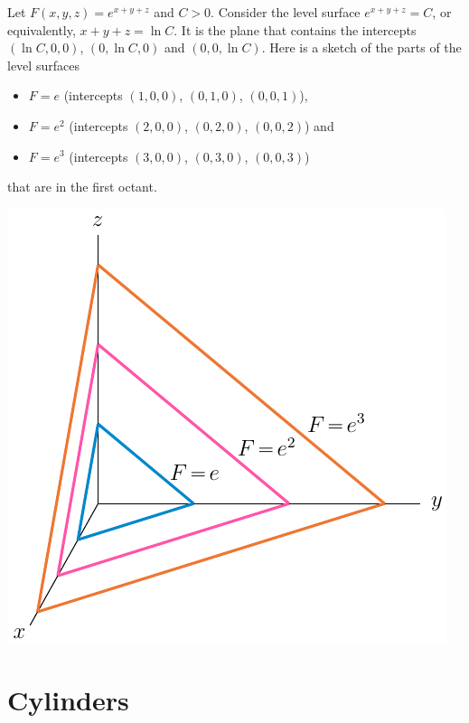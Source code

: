 \bigskip\goodbreak
\begin{eg}[$F(x,y,z)=e^{x+y+z}$]\label{eg level surface plane}
Let $F(x,y,z)=e^{x+y+z}$ and $C>0$. Consider the level surface
$e^{x+y+z}=C$, or equivalently, $x+y+z=\ln C$. It is the plane
that contains the intercepts $(\ln C,0,0)$, $(0,\ln C,0)$ and
$(0,0,\ln C)$.
Here is a sketch of the parts of the level surfaces 
\begin{itemize}\itemsep1pt \parskip0pt 
\item       $F=e$ (intercepts $(1,0,0)$, $(0,1,0)$, $(0,0,1)$), 
\item       $F=e^2$ (intercepts $(2,0,0)$, $(0,2,0)$, $(0,0,2)$) and 
\item       $F=e^3$ (intercepts $(3,0,0)$, $(0,3,0)$, $(0,0,3)$)
\end{itemize}
that are in the first octant.
\begin{efig}
\begin{center}
   \includegraphics{rampABC.pdf}
\end{center}
\end{efig}
\end{eg}
 

\section{Cylinders}\label{sec cylinders}

